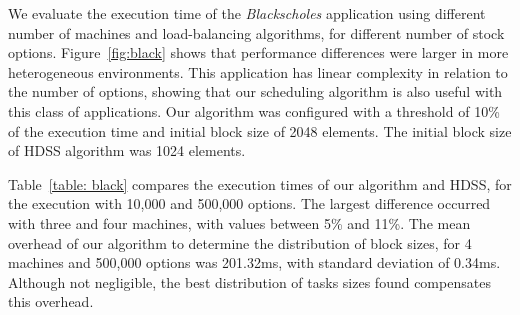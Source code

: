 \documentclass[journal]{IEEEtran}
\begin{document}
We evaluate the execution time of the \emph{Blackscholes} application using
different number of machines and load-balancing algorithms, for different number
of stock options. Figure~\ref{fig:black} shows that performance differences were
larger in more heterogeneous environments. This application has linear
complexity in relation to the number of options, showing that our scheduling
algorithm is also useful with this class of applications. Our algorithm was
configured with a threshold of 10\% of the execution time and initial block size
of 2048 elements. The initial block size of HDSS algorithm was 1024 elements.

Table~\ref{table: black} compares the execution times of our algorithm and HDSS,
for the execution with 10,000 and 500,000 options. The largest difference
occurred with three and four machines, with values between 5\% and 11\%. The
mean overhead of our algorithm to determine the distribution of block sizes, for
4 machines and 500,000 options was 201.32ms, with standard deviation of 0.34ms.
Although not negligible, the best distribution of tasks sizes found compensates
this overhead.



\end{document}

